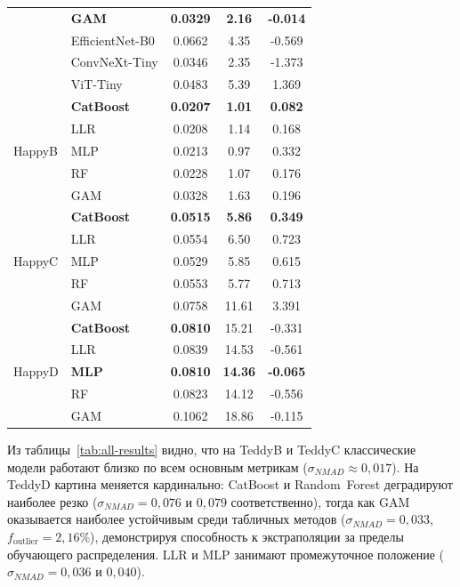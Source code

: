 \documentclass[12pt,a4paper]{article}
\begin{document}
\begin{table}[htbp]
\begin{tabular}{|l|l|c|c|c|}
 & \textbf{GAM} & \textbf{0.0329} & \textbf{2.16} & \textbf{-0.014} \\
 & EfficientNet-B0 & 0.0662 & 4.35 & -0.569 \\
 & ConvNeXt-Tiny & 0.0346 & 2.35 & -1.373 \\
 & ViT-Tiny & 0.0483 & 5.39 & 1.369 \\
\hline
\multirow{5}{*}{HappyB} & \textbf{CatBoost} & \textbf{0.0207} & \textbf{1.01} & \textbf{0.082} \\
 & LLR & 0.0208 & 1.14 & 0.168 \\
 & MLP & 0.0213 & 0.97 & 0.332 \\
 & RF & 0.0228 & 1.07 & 0.176 \\
 & GAM & 0.0328 & 1.63 & 0.196 \\
\hline
\multirow{5}{*}{HappyC} & \textbf{CatBoost} & \textbf{0.0515} & \textbf{5.86} & \textbf{0.349} \\
 & LLR & 0.0554 & 6.50 & 0.723 \\
 & MLP & 0.0529 & 5.85 & 0.615 \\
 & RF & 0.0553 & 5.77 & 0.713 \\
 & GAM & 0.0758 & 11.61 & 3.391 \\
\hline
\multirow{5}{*}{HappyD} & \textbf{CatBoost} & \textbf{0.0810} & 15.21 & -0.331 \\
 & LLR & 0.0839 & 14.53 & -0.561 \\
 & \textbf{MLP} & \textbf{0.0810} & \textbf{14.36} & \textbf{-0.065} \\
 & RF & 0.0823 & 14.12 & -0.556 \\
 & GAM & 0.1062 & 18.86 & -0.115 \\
\hline
\end{tabular}
\end{table}

Из таблицы~\ref{tab:all-results} видно, что на TeddyB и TeddyC классические модели работают близко по всем основным метрикам ($\sigma_{NMAD} \approx 0{,}017$). На TeddyD картина меняется кардинально: CatBoost и Random~Forest деградируют наиболее резко ($\sigma_{NMAD} = 0{,}076$ и $0{,}079$ соответственно), тогда как GAM оказывается наиболее устойчивым среди табличных методов ($\sigma_{NMAD} = 0{,}033$, $f_{\mathrm{outlier}} = 2{,}16\%$), демонстрируя способность к экстраполяции за пределы обучающего распределения. LLR и MLP занимают промежуточное положение ($\sigma_{NMAD} = 0{,}036$ и $0{,}040$).
\end{document}
